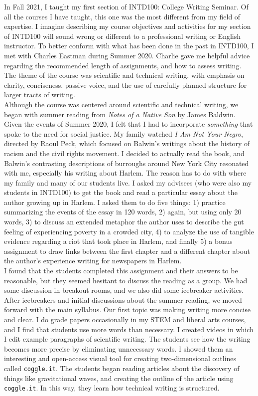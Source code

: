 \documentclass[../../../main.tex]{subfiles}
\begin{document}
In Fall 2021, I taught my first section of INTD100: College Writing Seminar.  Of all the courses I have taught, this one was the most different from my field of expertise.  I imagine describing my course objectives and activities for my section of INTD100 will sound wrong or different to a professional writing or English instructor.  To better conform with what has been done in the past in INTD100, I met with Charles Eastman during Summer 2020.  Charlie gave me helpful advice regarding the recommended length of assignments, and how to assess writing.  The theme of the course was scientific and technical writing, with emphasis on clarity, conciseness, passive voice, and the use of carefully planned structure for larger tracts of writing.
\\
\vspace{0.25cm}
Although the course was centered around scientific and technical writing, we began with summer reading from \textit{Notes of a Native Son} by James Baldwin.  Given the events of Summer 2020, I felt that I had to incorporate \textit{something} that spoke to the need for social justice.  My family watched \textit{I Am Not Your Negro}, directed by Raoul Peck, which focused on Balwin's writings about the history of racism and the civil rights movement.  I decided to actually read the book, and Balwin's contrasting descriptions of burroughs around New York City resonated with me, especially his writing about Harlem.  The reason has to do with where my family and many of our students live.  I asked my advisees (who were also my students in INTD100) to get the book and read a particular essay about the author growing up in Harlem.  I asked them to do five things: 1) practice summarizing the events of the essay in 120 words, 2) again, but using only 20 words, 3) to discuss an extended metaphor the author uses to describe the gut feeling of experiencing poverty in a crowded city, 4) to analyze the use of tangible evidence regarding a riot that took place in Harlem, and finally 5) a bonus assignment to draw links between the first chapter and a different chapter about the author's experience writing for newspapers in Harlem.
\\
\vspace{0.25cm}
I found that the students completed this assignment and their answers to be reasonable, but they seemed hesitant to discuss the reading as a group.  We had some discussion in breakout rooms, and we also did some icebreaker activities.  After icebreakers and initial discussions about the summer reading, we moved forward with the main syllabus.  Our first topic was making writing more concise and clear.  I do grade papers occasionally in my STEM and liberal arts courses, and I find that students use more words than necessary.  I created videos in which I edit example paragraphs of scientific writing.  The students see how the writing becomes more precise by eliminating unnecessary words.  I showed them an interesting and open-access visual tool for creating two-dimensional outlines called \verb+coggle.it+.  The students began reading articles about the discovery of things like gravitational waves, and creating the outline of the article using \verb+coggle.it+.  In this way, they learn how technical writing is structured.
\end{document}

